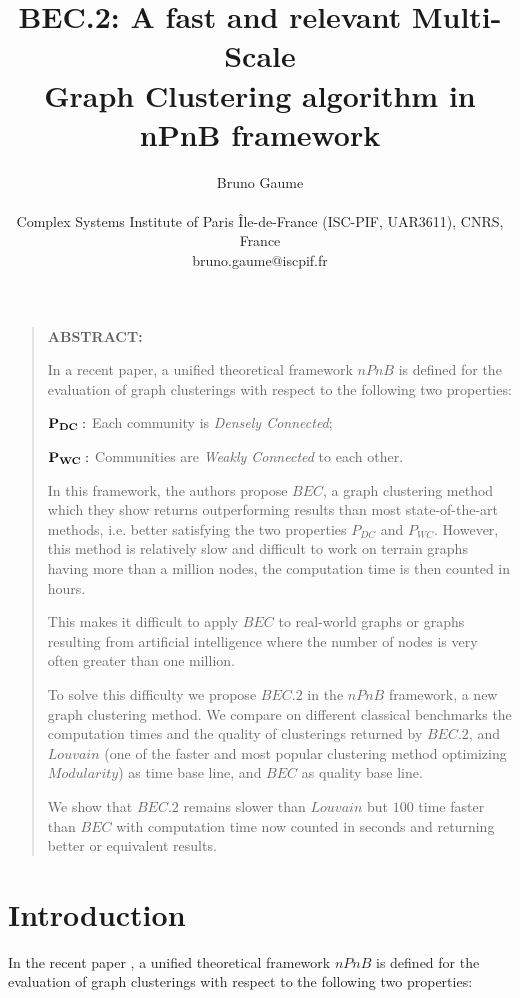 \documentclass[12pt]{article}
\title{BEC.2: A fast and relevant Multi-Scale\\ Graph Clustering algorithm  in nPnB framework}
\author
{Bruno Gaume\\
\\
\normalsize{Complex Systems Institute of Paris Île-de-France (ISC-PIF, UAR3611), CNRS, France}\\
\normalsize{bruno.gaume@iscpif.fr}
}
\date{}
\newenvironment{sciabstract}{
\begin{quote} \bf}
{\end{quote}}
\theoremstyle{thmstyleone}%
\theoremstyle{definition}
\begin{document}
\baselineskip16pt
\maketitle

\begin{sciabstract}
{\bf ABSTRACT:}


In a recent paper, a unified theoretical framework $nPnB$ is defined for the evaluation of graph clusterings with respect to the following two properties:

    \hspace{1cm}$\bf P_{DC}:$ Each community is {\it Densely Connected}; \vspace{-0.10cm}

    \hspace{1cm}$\bf P_{WC}:$  Communities are {\it Weakly Connected} to each other.

In this framework, the authors propose $BEC$, a graph clustering method which they show returns outperforming results than most state-of-the-art methods, i.e. better satisfying the two properties $P_{DC}$ and $P_{WC}$. However, this method is relatively slow and difficult to work on terrain graphs having more than a million nodes, the computation time is then counted in hours.


This makes it difficult to apply $BEC$ to real-world graphs or graphs resulting from artificial intelligence where the number of nodes is very often greater than one million.

To solve this difficulty we propose $BEC.2$ in the $nPnB$ framework, a new  graph clustering method.
%
We compare on different classical benchmarks the computation times and the quality of clusterings
returned by $BEC.2$, and $Louvain$ (one of the faster and most popular clustering method optimizing $Modularity$) as time base line, and $BEC$ as quality base line.

We show that $BEC.2$ remains slower than $Louvain$ but $100$ time faster than $BEC$ with computation time now counted in seconds and returning better or equivalent results.
\end{sciabstract}
\newpage
%
\section*{Introduction}
In the recent paper \cite{Gaume_BEC1_2025}, a unified theoretical framework $nPnB$ is defined for the evaluation of graph clusterings with respect to the following two properties:
\end{document}
